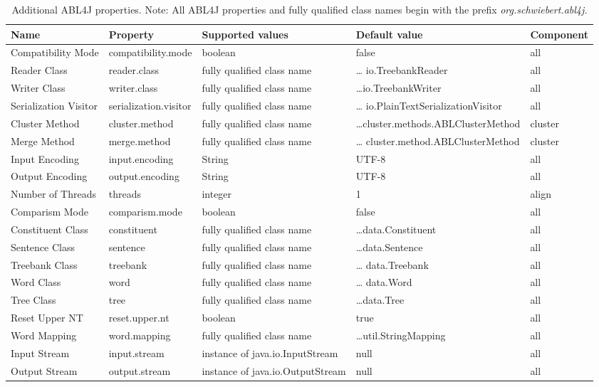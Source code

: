 \documentclass[12pt,a4paper]{article}
\begin{document}
\begin{landscape}
\begin{table}
\label{additional_options}
\begin{tabular}[h]{|p{4cm}|p{3.5cm}|p{5.0cm}|p{5.5cm}|p{2cm}|} \hline
Name & Property & Supported values & Default value & Component \\ \hline
Compatibility Mode &compatibility.mode&boolean&false&all\\ \hline
Reader Class&reader.class&fully qualified class name&\ldots
io.TreebankReader&all \\ \hline Writer Class&writer.class&fully qualified class
name&\ldots io.TreebankWriter&all \\ \hline Serialization
Visitor&serialization.visitor&fully qualified class name&\ldots
io.\newline PlainTextSerializationVisitor&all \\ \hline Cluster
Method&cluster.method&fully qualified class name&\ldots cluster.methods.\newline ABLClusterMethod&cluster \\ \hline Merge
Method&merge.method&fully qualified class name&\ldots
cluster.method.\newline ABLClusterMethod&cluster \\ \hline Input
Encoding&input.encoding&String&UTF-8&all \\ \hline Output Encoding&output.encoding&String&UTF-8&all \\ \hline Number of
Threads&threads&integer&1&align \\ \hline Comparism
Mode&comparism.mode&boolean&false&all \\ \hline Constituent Class
&constituent&fully qualified class name&\ldots data.Constituent&all\\ \hline
Sentence Class&sentence&fully qualified class name&\ldots data.Sentence&all \\
\hline Treebank Class&treebank&fully qualified class name&\ldots
data.Treebank&all \\ \hline Word Class&word&fully qualified class name&\ldots
data.Word&all \\ \hline Tree Class&tree&fully qualified class name&\ldots data.Tree&all \\ \hline Reset Upper
NT&reset.upper.nt&boolean&true&all \\ \hline Word Mapping&word.mapping&fully
qualified class name&\ldots util.StringMapping&all\\ \hline
Input Stream&input.stream&instance of java.io.InputStream&
null&all\\ \hline
Output Stream&output.stream&instance of java.io.OutputStream&
null&all
\\
\hline

\end{tabular}
\caption{Additional ABL4J properties. Note: All ABL4J properties and fully
qualified class names begin with the prefix \emph{org.schwiebert.abl4j.}}
\end{table}
\end{landscape}
\end{document}
